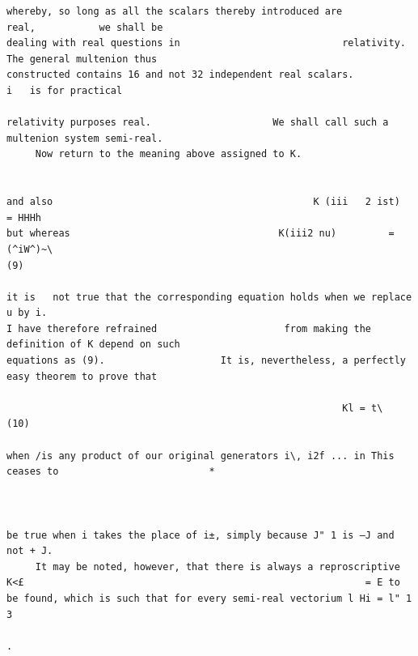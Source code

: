\documentclass[10pt]{article}
\begin{document}
\begin{verbatim}
whereby, so long as all the scalars thereby introduced are                                        real,           we shall be
dealing with real questions in                            relativity.              The general multenion thus
constructed contains 16 and not 32 independent real scalars.                                               i   is for practical

relativity purposes real.                     We shall call such a multenion system semi-real.
     Now return to the meaning above assigned to K.


and also                                             K (iii   2 ist)   = HHHh
but whereas                                    K(iii2 nu)         = (^iW^)~\                                                             (9)

it is   not true that the corresponding equation holds when we replace u by i.
I have therefore refrained                      from making the definition of K depend on such
equations as (9).                    It is, nevertheless, a perfectly easy theorem to prove that

                                                          Kl = t\                                                                       (10)

when /is any product of our original generators i\, i2f ... in This ceases to                          *



be true when i takes the place of i±, simply because J" 1 is —J and not + J.
     It may be noted, however, that there is always a reproscriptive K<£                                                           = E to
be found, which is such that for every semi-real vectorium l Hi = l" 1                             3
                                                                                                                               .


\end{verbatim}
\clearpage
\end{document}
